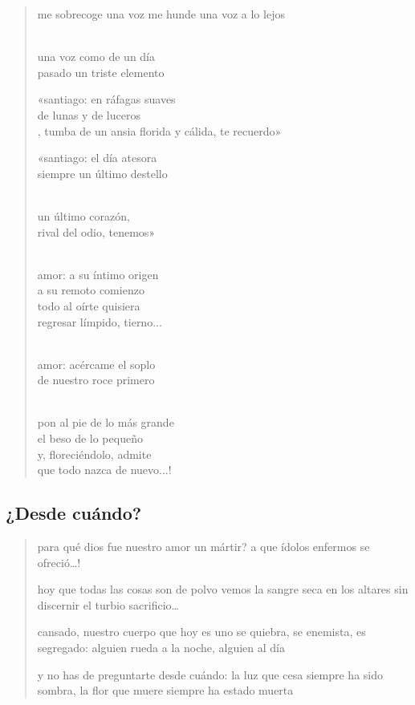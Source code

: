 \documentclass[a4paper, 12pt]{article}
\begin{document}
\normalsize
\begin{verse}
   
me sobrecoge una voz
me hunde una voz a lo lejos \\
~ 

una voz como de un día\\
pasado un triste elemento
~ 

«santiago: en ráfagas suaves\\
de lunas y de luceros\\,
tumba de un ansia florida
y cálida, te recuerdo»
~ 

«santiago: el día atesora\\
siempre un último destello\\
~

un último corazón,\\
rival del odio, tenemos»\\
~

amor: a su íntimo origen\\
a su remoto comienzo\\
todo al oírte quisiera\\
regresar límpido, tierno...\\
~ 

amor: acércame el soplo\\
de nuestro roce primero\\
~

pon al pie de lo más grande\\
el beso de lo pequeño\\
y, floreciéndolo, admite\\
que todo nazca de nuevo...!
\end{verse}

\pagebreak
\subsection{¿Desde cuándo?}

\begin{verse}

para qué dios fue nuestro amor un mártir?
a que ídolos enfermos se ofreció\ldots!
~ 

hoy que todas las cosas son de polvo 
vemos la sangre seca en los altares
sin discernir el turbio sacrificio\ldots
~ 

cansado, nuestro cuerpo que hoy es uno
se quiebra, se enemista, es segregado:
alguien rueda a la noche, alguien al día
~ 

y no has de preguntarte desde cuándo:
la luz que cesa siempre ha sido sombra,
la flor que muere siempre ha estado muerta

   
\end{verse}
\end{document}
